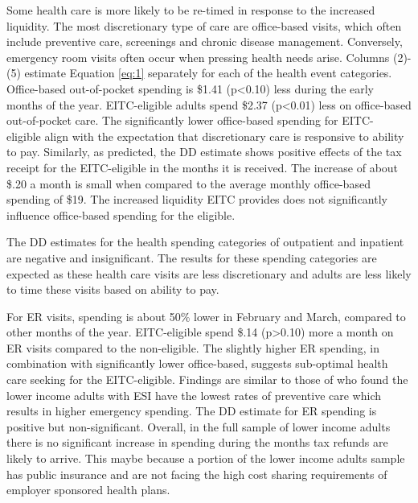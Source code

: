 \documentclass[smallcondensed,referee]{svjour3}
\begin{document}
Some health care is more likely to be re-timed in response to the increased liquidity. The most discretionary type of care are office-based visits, which often include preventive care, screenings and chronic disease management. Conversely, emergency room visits often occur when pressing health needs arise. Columns (2)-(5) estimate Equation \ref{eq:1} separately for each of the health event categories. Office-based out-of-pocket spending is \$1.41 (p<0.10) less during the early months of the year. EITC-eligible adults spend  \$2.37 (p<0.01) less on office-based out-of-pocket care.  The significantly lower office-based spending for EITC- eligible align with the expectation that discretionary care is responsive to ability to pay.  Similarly, as predicted, the DD estimate shows positive effects of the tax receipt for the EITC-eligible in the months it is received. The increase of about \$.20 a month is small when compared to the average monthly office-based spending of \$19. The increased liquidity EITC provides does not significantly influence office-based spending for the eligible.

The DD estimates for the health spending categories of outpatient and inpatient are negative and insignificant. The results for these spending categories are expected as these health care visits are less discretionary and adults are less likely to time these visits based on ability to pay. 

For ER visits, spending is about 50\% lower in February and March, compared to other months of the year. EITC-eligible spend \$.14 (p>0.10) more a month on ER visits compared to the non-eligible. The slightly higher ER spending, in combination with significantly lower office-based, suggests sub-optimal health care seeking for the EITC-eligible. Findings are similar to those of \cite{sherman_health_2017} who found the lower income adults with ESI have the lowest rates of preventive care which results in higher emergency spending. The DD estimate for ER spending is positive but non-significant. Overall, in the full sample of lower income adults there is no significant increase in spending during the months tax refunds are likely to arrive. This maybe because a portion of the lower income adults sample has public insurance and are not facing the high cost sharing requirements of employer sponsored health plans.
 
\end{document}
